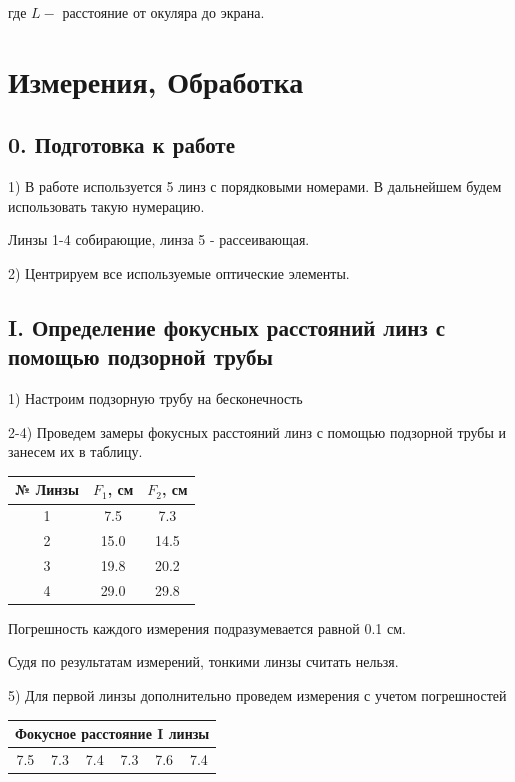 \documentclass{astroedu-lab}
\begin{document}
\begin{problem}
где $L-$ расстояние от окуляра до экрана.

\section{Измерения, Обработка}

\subsection{0. Подготовка к работе}

1) В работе используется 5 линз с порядковыми номерами. В дальнейшем будем использовать такую нумерацию.

Линзы 1-4 собирающие, линза 5 - рассеивающая.

2) Центрируем все используемые оптические элементы.

\subsection{I. Определение фокусных расстояний линз с помощью подзорной трубы}

1) Настроим подзорную трубу на бесконечность

2-4) Проведем замеры фокусных расстояний линз с помощью подзорной трубы и занесем их в таблицу.

\begin{center}
\begin{tabular}{|c|c|c|}
\hline 
№ Линзы & $F_1$, см & $F_2$, см \\
\hline
1 & 7.5 & 7.3 \\
2 & 15.0 & 14.5 \\
3 & 19.8 & 20.2 \\
4 & 29.0 & 29.8 \\
\hline
\end{tabular}
\end{center}

Погрешность каждого измерения подразумевается равной 0.1 см.

Судя по результатам измерений, тонкими линзы считать нельзя.

5) Для первой линзы дополнительно проведем измерения с учетом погрешностей

\begin{center}
\begin{tabular}{|c|c|c|c|c|c|}
\hline 
\multicolumn{6}{|c|}{Фокусное расстояние I линзы} \\
\hline
7.5 & 7.3 & 7.4 & 7.3 & 7.6 & 7.4 \\
\hline
\end{tabular}
\end{center}


\end{problem}
\end{document}
